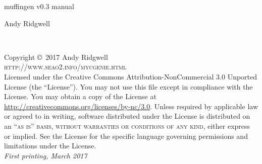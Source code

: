 \documentclass[11pt,fleqn]{book} %
\begin{document}

\begingroup
\thispagestyle{empty}
\centering
\vspace*{9cm}
\par\normalfont\fontsize{35}{35}\sffamily\selectfont
muffingen v0.3 manual\par %
\vspace*{1cm}
{\Huge Andy Ridgwell}\par %
\endgroup


\newpage
~\vfill
\thispagestyle{empty}

\noindent Copyright \copyright\ 2017 Andy Ridgwell\\ %

\noindent \textsc{http://www.seao2.info/mycgenie.html}\\ %

\noindent Licensed under the Creative Commons Attribution-NonCommercial 3.0 Unported License (the ``License''). You may not use this file except in compliance with the License. You may obtain a copy of the License at \url{http://creativecommons.org/licenses/by-nc/3.0}. Unless required by applicable law or agreed to in writing, software distributed under the License is distributed on an \textsc{``as is'' basis, without warranties or conditions of any kind}, either express or implied. See the License for the specific language governing permissions and limitations under the License.\\ %

\noindent \textit{First printing, March 2017} %



\pagestyle{empty} %
\end{document}
